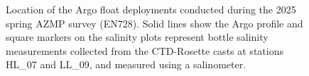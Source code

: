 \documentclass[12pt]{article}\usepackage[]{graphicx}\usepackage[]{color}
\begin{document}
\hspace*{-0.2in}
\begin{figure}[htb]

{\centering {} 

}

\caption{Location of the Argo float deployments conducted during the 2025 spring AZMP survey (EN728). Solid lines show the Argo profile and square markers on the salinity plots represent bottle salinity measurements collected from the CTD-Rosette casts at stations HL_07 and LL_09, and measured using a salinometer.}\label{fig:figure2}
\end{figure}
\clearpage
\end{document}
